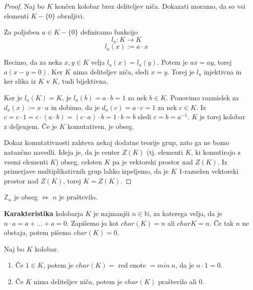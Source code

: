 \documentclass[11pt, a4paper]{article}
\begin{document}
    \begin{proof}
        Naj bo \(K\) končen kolobar brez deliteljev niča. Dokazati moramo, da so vsi elementi \(K - \{0\}\) obrnljivi.
        \par
        Za poljuben \(a \in K - \{0\}\) definiramo funkcijo
        \[l_a: K \rightarrow K\] 
        \[l_a(x) := a \cdot x\]
        \par
        Recimo, da za neka \(x,y \in K\) velja \(l_a(x) = l_a(y)\). Potem je \(ax = ay\), torej \(a(x-y = 0)\). Ker \(K\) nima deliteljev niča, sledi \(x = y\). Torej je \(l_a\) injektivna in ker slika iz \(K\) v \(K\), tudi bijektivna.
        \par
        Ker je \(l_a(K) = K\), je \(l_a(b) = a \cdot b = 1\) za nek \(b \in K\). Ponovimo razmislek za \(d_a (x):= x \cdot a\) in dobimo, da je \(d_a(c) = a \cdot c = 1\) za nek \(c \in K\). Iz \(c = c \cdot 1 = c \cdot (a \cdot b) = (c \cdot a) \cdot b = 1 \cdot b = b\) sledi \(c = b = a^{-1}\). \(K\) je torej kolobar z deljenjem. Če je \(K\) komutativen, je obseg.
        \par
        Dokaz komutativnosti zahteva nekaj dodatne teorije grup, zato ga ne bomo natančno navedli. Ideja je, da je center \(Z(K)\) (tj. elementi \(K\), ki komutirajo z vsemi elementi \(K\)) obseg, celoten \(K\) pa je vektorski prostor nad \(Z(K)\). Iz primerjave multiplikativnih grup lahko izpeljemo, da je \(K\) 1-razsežen vektorski prostor nad \(Z(K)\), torej \(K = Z(K)\).
    \end{proof}

    \begin{corollary}
        \(\mathbb{Z}_n\) je obseg \(\Leftrightarrow\) \(n\) je praštevilo.
    \end{corollary}

    \begin{definition}
        \textbf{Karakteristika} kolobarja \(K\) je najmanjši \(n \in \mathbb{N}\), za katerega velja, da je \(n \cdot a = a+...+a=0\). Zapišemo jo kot \(char(K)=n\) ali \(char K = n\). Če tak \(n\) ne obstaja, potem pišemo \(char(K) = 0\).
    \end{definition}

    \begin{proposition}
        Naj bo \(K\) kolobar.
        \begin{enumerate}[label=\alph*)]
            \item Če \(1 \in K\), potem je \(char(K) = \) red enote \(= min\ n\), da je \(n \cdot 1 = 0\).
            \item Če \(K\) nima deliteljev niča, potem je \(char(K)\) praštevilo ali \(0\). 
        \end{enumerate}
    \end{proposition}
\end{document}
